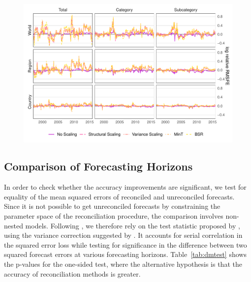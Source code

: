 \documentclass[a4paper,fleqn,11pt]{article}
\begin{document}
\begin{figure}[H]
	\includegraphics[width=\textwidth]{fig/fig_eval_rmse_time}
	\label{fig:rmse_time}
\end{figure}

\subsection{Comparison of Forecasting Horizons}
In order to check whether the accuracy improvements are significant, we test for equality of the mean squared errors of reconciled and unreconciled forecasts. Since it is not possible to get unreconciled forecasts by constraining the parameter space of the reconciliation procedure, the comparison involves non-nested models. Following \cite{Clark2013}, we therefore rely on the test statistic proposed by \cite{Diebold1995}, using the variance correction suggested by \cite{Harvey1997}. It accounts for serial correlation in the squared error loss while testing for significance in the difference between two squared forecast errors at various forecasting horizons. Table~\ref{tab:dmtest} shows the p-values for the one-sided test, where the alternative hypothesis is that the accuracy of reconciliation methods is greater. 
\end{document}
